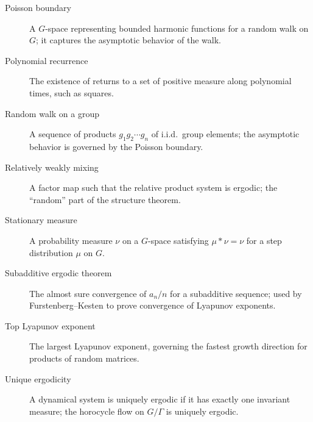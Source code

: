 \begin{description}
    \item[Poisson boundary] A \(G\)-space representing bounded harmonic functions for a random walk on \(G\); it captures the asymptotic behavior of the walk.
    \item[Polynomial recurrence] The existence of returns to a set of positive measure along polynomial times, such as squares.
    \item[Random walk on a group] A sequence of products \(g_1g_2\cdots g_n\) of i.i.d.\ group elements; the asymptotic behavior is governed by the Poisson boundary.
    \item[Relatively weakly mixing] A factor map such that the relative product system is ergodic; the ``random'' part of the structure theorem.
    \item[Stationary measure] A probability measure \(\nu\) on a \(G\)-space satisfying \(\mu * \nu = \nu\) for a step distribution \(\mu\) on \(G\).
    \item[Subadditive ergodic theorem] The almost sure convergence of \(a_n/n\) for a subadditive sequence; used by Furstenberg--Kesten to prove convergence of Lyapunov exponents.
    \item[Top Lyapunov exponent] The largest Lyapunov exponent, governing the fastest growth direction for products of random matrices.
    \item[Unique ergodicity] A dynamical system is uniquely ergodic if it has exactly one invariant measure; the horocycle flow on \(G/\Gamma\) is uniquely ergodic.
\end{description}


